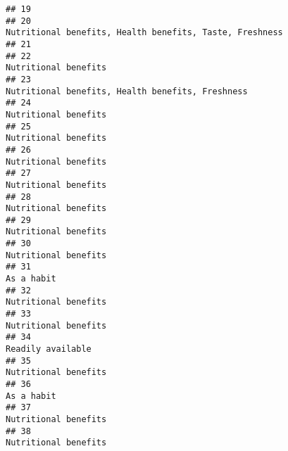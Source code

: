 \documentclass[
]{article}
\begin{document}
\begin{verbatim}
## 19                                                                                                                            
## 20                                                                     Nutritional benefits, Health benefits, Taste, Freshness
## 21                                                                                                                            
## 22                                                                                                        Nutritional benefits
## 23                                                                            Nutritional benefits, Health benefits, Freshness
## 24                                                                                                        Nutritional benefits
## 25                                                                                                        Nutritional benefits
## 26                                                                                                        Nutritional benefits
## 27                                                                                                        Nutritional benefits
## 28                                                                                                        Nutritional benefits
## 29                                                                                                        Nutritional benefits
## 30                                                                                                        Nutritional benefits
## 31                                                                                                                  As a habit
## 32                                                                                                        Nutritional benefits
## 33                                                                                                        Nutritional benefits
## 34                                                                                                           Readily available
## 35                                                                                                        Nutritional benefits
## 36                                                                                                                  As a habit
## 37                                                                                                        Nutritional benefits
## 38                                                                                                        Nutritional benefits

\end{verbatim}
\end{document}
